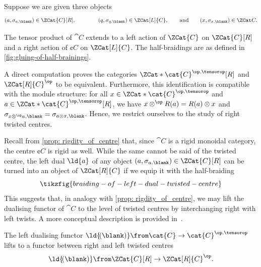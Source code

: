 Suppose we are given three objects
\[
  (a, \sigma_{a, \blank}) \in \ZCat{C}[R],
  \qquad\qquad
  (q, \sigma_{q, \blank}) \in \ZCat[L]{C},
  \qquad\text{and}\qquad
  (x, \sigma_{x, \blank}) \in \ZCat C.
\]

\begin{proposition}\label{prop: Left_or_right_twisted_centre_is_mod_cat}
  The tensor product of \(\cat{C}\) extends to
  a left action of \(\ZCat{C}\) on \(\ZCat{C}[R]\)
  and a right action of \(\cent{C}\) on \(\ZCat[L]{C}\).
  The half-braidings are as defined in \cref{fig:gluing-of-half-brainings}.
  \begin{figure}[htbp]
    \centering
  \end{figure}
\end{proposition}

\begin{remark}\label{rem: right_vs_left_twisted_centres}
  A direct computation proves the categories \(\ZCat*{\cat{C}^{\op, \tensorop}}[R]\) and \(\ZCat[R]{C}^{\op}\) to be equivalent.
  Furthermore, this identification is compatible with the module structure:
  for all \(x \in \ZCat*{\cat{C}^{\op, \tensorop}}\) and \(a \in \ZCat*{\cat{C}^{\op, \tensorop}}[R]\),
  we have
  \(x \mathbin{\otimes^{\op}} R(a) = R(a) \otimes x\)
  and \(\sigma_{x \mathbin{\otimes^{\op}} a, \blank} = \sigma_{a \otimes x, \blank}\).
  Hence, we restrict ourselves to the study of right twisted centres.
\end{remark}

Recall from \cref{prop: rigdity_of_centre} that, since \(\cat{C}\) is a rigid monoidal category,
the centre \(\cent{C}\) is rigid as well.
While the same cannot be said of the twisted centre,
the left dual \(\ld{a}\) of any object \((a, \sigma_{a,\blank}) \in \ZCat{C}[R]\)
can be turned into an object of \(\ZCat[R]{C}\) if we equip it with the half-braiding
\[
  \tikzfig{braiding-of-left-dual-twisted-centre}
\]
This suggests that, in analogy with \cref{prop: rigdity_of_centre},
we may lift the dualising functor of \(\cat{C}\) to the level of twisted centres by interchanging right with left twists.
A more conceptual description is provided in~\cite[Proposition~3.15]{femić23:categ-yetter}.

\begin{proposition}\label{prop: left_dualising_as_a_module_fun}
  The left dualising functor \(\ld{\!(\blank)} \from \cat{C} \to \cat{C}^{\op, \tensorop}\) lifts to a functor between right and left twisted centres
  \[
    \ld{\!(\blank)} \from \ZCat{C}[R] \to \ZCat[R]{C}^{\op}.
  \]
\end{proposition}

